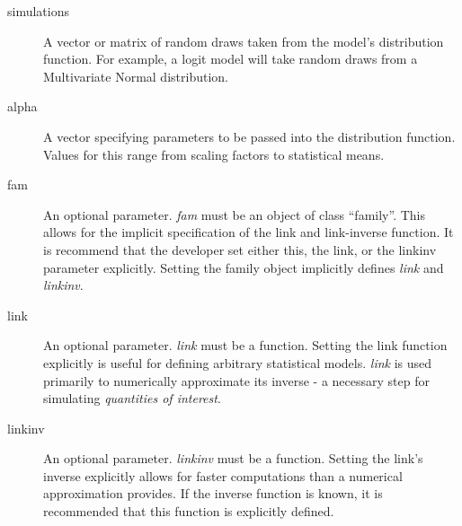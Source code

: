 \begin{description}
	\item[simulations] A vector or matrix of random draws taken from
		the model's distribution function.  For example, a logit model
		will take random draws from a Multivariate Normal distribution.
		
	\item[alpha] A vector specifying parameters to be passed into
		the distribution function.  Values for this range from scaling
		factors to statistical means.
	
	\item[fam] An optional parameter.  \emph{fam} must be an object
		of class ``family''.  This allows for the implicit specification
		of the link and link-inverse function.  It is recommend that the
		developer set either this, the link, or the linkinv parameter
		explicitly.  Setting the family object implicitly defines
		\emph{link} and \emph{linkinv}.
		
	\item[link] An optional parameter.  \emph{link} must be a function.
		Setting the link function explicitly is useful for defining
		arbitrary statistical models.  \emph{link} is used primarily to
		numerically approximate its inverse - a necessary step for
		simulating \emph{quantities of interest}.
		
	\item[linkinv] An optional parameter.  \emph{linkinv} must be a
		function.  Setting the link's inverse explicitly allows for faster
		computations than a numerical approximation provides.  If the
		inverse function is known, it is recommended that this function
		is explicitly defined.
		
\end{description}


